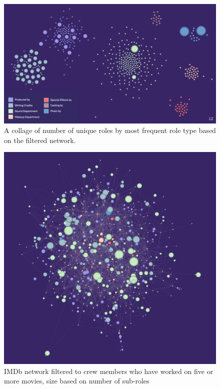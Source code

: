 \documentclass[12pt]{article}
\begin{document}
\begin{figure}[H]
    \centering
    \includegraphics[clip,scale=0.5] {2_rolechangebyrole.png}
    \caption{A collage of number of unique roles by most frequent role type based on the filtered network.}
    \label{fig:networkorlechangebyrole}
\end{figure}

\begin{figure}[H]
    \centering
    \includegraphics[clip,scale=0.12] {2_subroles_filtered.png}
    \caption{IMDb network filtered to crew members who have worked on five or more movies, size based on number of sub-roles}
    \label{fig:networkfiltered_roles}
\end{figure}
\end{document}
